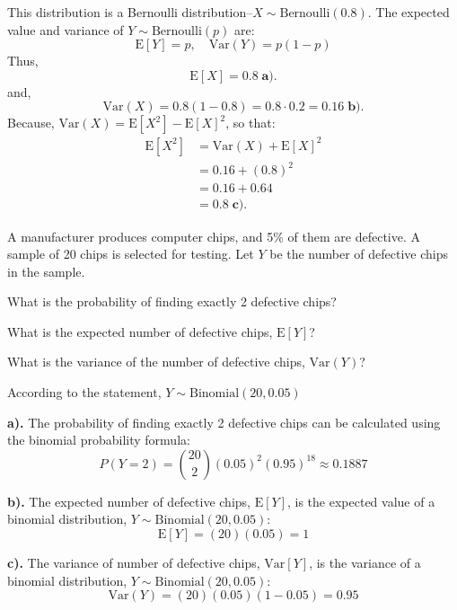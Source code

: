 \documentclass[a4paper, 10pt]{article}
\begin{document}
\begin{solution}
	This distribution is a Bernoulli distribution--\( X \sim \text{Bernoulli}(0.8) \).
	The expected value and variance of \( Y \sim \text{Bernoulli}(p) \) are:
	\[
		\text{E}[Y] = p, \quad \text{Var}(Y) = p(1 - p)
	\]
	Thus,
	\[
		\text{E}[X] = \boxed{0.8} \; \textbf{a).}
	\]
	and,
	\[
		\text{Var}(X) = 0.8(1 - 0.8) = 0.8 \cdot 0.2 = \boxed{0.16} \; \textbf{b).}
	\]
	Because, \( \text{Var}(X) = \text{E}[X^2] - \text{E}[X]^2 \), so that:
	\begin{align*}
		\text{E}[X^2] & = \text{Var}(X) + \text{E}[X]^2 \\
		              & = 0.16 + (0.8)^2                \\
		              & = 0.16 + 0.64                   \\
		              & = \boxed{0.8} \; \textbf{c).}
	\end{align*}
\end{solution}

\begin{problem}
A manufacturer produces computer chips, and 5\% of them are defective.
A sample of 20 chips is selected for testing.
Let \( Y \) be the number of defective chips in the sample.
\begin{subproblems_alpha}
	\item What is the probability of finding exactly 2 defective chips?
	\item What is the expected number of defective chips, \( \text{E}[Y] \)?
	\item What is the variance of the number of defective chips, \( \text{Var}(Y) \)?
\end{subproblems_alpha}
\end{problem}

\begin{tosubmit}
	According to the statement, \( Y \sim \text{Binomial}(20, 0.05) \)

	\par\textbf{a).} The probability of finding exactly 2 defective chips
	can be calculated using the binomial probability formula:
	\[
		P(Y = 2) = \binom{20}{2} (0.05)^{2} (0.95)^{18} \approx \boxed{0.1887}
	\]

	\par\textbf{b).} The expected number of defective chips, \( \text{E}[Y] \),
	is the expected value of a binomial distribution, \( Y \sim \text{Binomial}(20, 0.05) \):
	\[
		\text{E}[Y] = (20)(0.05) = \boxed{1}
	\]

	\par\textbf{c).} The variance of number of defective chips, \( \text{Var}[Y] \),
	is the variance of a binomial distribution, \( Y \sim \text{Binomial}(20, 0.05) \):
	\[
		\text{Var}(Y) = (20)(0.05)(1-0.05) = \boxed{0.95}
	\]
\end{tosubmit}
\end{document}
